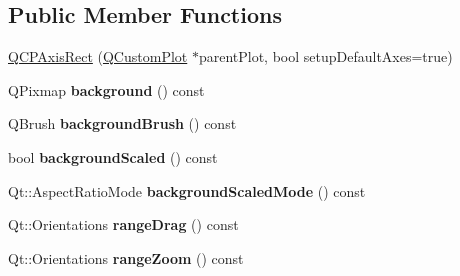 \subsection*{Public Member Functions}
\begin{DoxyCompactItemize}
\item 
\hyperlink{class_q_c_p_axis_rect_a60b31dece805462c1b82eea2e69ba042}{Q\+C\+P\+Axis\+Rect} (\hyperlink{class_q_custom_plot}{Q\+Custom\+Plot} $\ast$parent\+Plot, bool setup\+Default\+Axes=true)
\item 
Q\+Pixmap {\bfseries background} () const \hypertarget{class_q_c_p_axis_rect_a0daa1dadd2a62dbfa37b7f742edd0059}{}\label{class_q_c_p_axis_rect_a0daa1dadd2a62dbfa37b7f742edd0059}

\item 
Q\+Brush {\bfseries background\+Brush} () const \hypertarget{class_q_c_p_axis_rect_a6f8f9f9ff63a803a3cf8796e77a98123}{}\label{class_q_c_p_axis_rect_a6f8f9f9ff63a803a3cf8796e77a98123}

\item 
bool {\bfseries background\+Scaled} () const \hypertarget{class_q_c_p_axis_rect_a67c18777b88fe9c81dee3dd2b5f50e5c}{}\label{class_q_c_p_axis_rect_a67c18777b88fe9c81dee3dd2b5f50e5c}

\item 
Qt\+::\+Aspect\+Ratio\+Mode {\bfseries background\+Scaled\+Mode} () const \hypertarget{class_q_c_p_axis_rect_a3d0f42d6be11a0b3d4576402a2b0032d}{}\label{class_q_c_p_axis_rect_a3d0f42d6be11a0b3d4576402a2b0032d}

\item 
Qt\+::\+Orientations {\bfseries range\+Drag} () const \hypertarget{class_q_c_p_axis_rect_af24b46954ce27a26b23770cdb8319080}{}\label{class_q_c_p_axis_rect_af24b46954ce27a26b23770cdb8319080}

\item 
Qt\+::\+Orientations {\bfseries range\+Zoom} () const \hypertarget{class_q_c_p_axis_rect_a3397fc60e5df29089090bc236e9f05f6}{}\label{class_q_c_p_axis_rect_a3397fc60e5df29089090bc236e9f05f6}


\end{DoxyCompactItemize}
